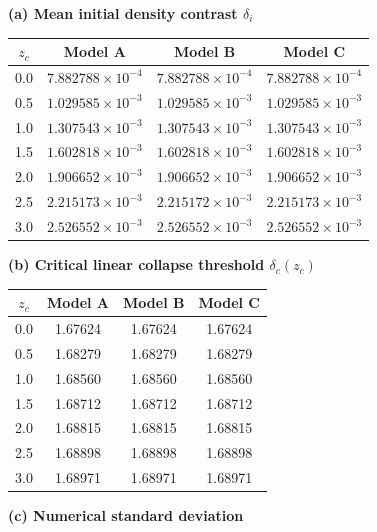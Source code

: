  \begin{table}[H]
\centering
\small

\textbf{(a) Mean initial density contrast $\delta_i$}
\label{tab:delta_c_models_comparison}
\begin{tabular}{c ccc}
\toprule
$z_c$ & Model A & Model B & Model C \\
\midrule
0.0 & $7.882788\times10^{-4}$ & $7.882788\times10^{-4}$ & $7.882788\times10^{-4}$ \\
0.5 & $1.029585\times10^{-3}$ & $1.029585\times10^{-3}$ & $1.029585\times10^{-3}$ \\
1.0 & $1.307543\times10^{-3}$ & $1.307543\times10^{-3}$ & $1.307543\times10^{-3}$ \\
1.5 & $1.602818\times10^{-3}$ & $1.602818\times10^{-3}$ & $1.602818\times10^{-3}$ \\
2.0 & $1.906652\times10^{-3}$ & $1.906652\times10^{-3}$ & $1.906652\times10^{-3}$ \\
2.5 & $2.215173\times10^{-3}$ & $2.215172\times10^{-3}$ & $2.215173\times10^{-3}$ \\
3.0 & $2.526552\times10^{-3}$ & $2.526552\times10^{-3}$ & $2.526552\times10^{-3}$ \\
\bottomrule
\end{tabular}

\vspace{0.4cm}

\textbf{(b) Critical linear collapse threshold $\delta_c(z_c)$}

\begin{tabular}{c ccc}
\toprule
$z_c$ & Model A & Model B & Model C \\
\midrule
0.0 & 1.67624 & 1.67624 & 1.67624 \\
0.5 & 1.68279 & 1.68279 & 1.68279 \\
1.0 & 1.68560 & 1.68560 & 1.68560 \\
1.5 & 1.68712 & 1.68712 & 1.68712 \\
2.0 & 1.68815 & 1.68815 & 1.68815 \\
2.5 & 1.68898 & 1.68898 & 1.68898 \\
3.0 & 1.68971 & 1.68971 & 1.68971 \\
\bottomrule
\end{tabular}

\vspace{0.4cm}

\textbf{(c) Numerical standard deviation}


\end{table}
